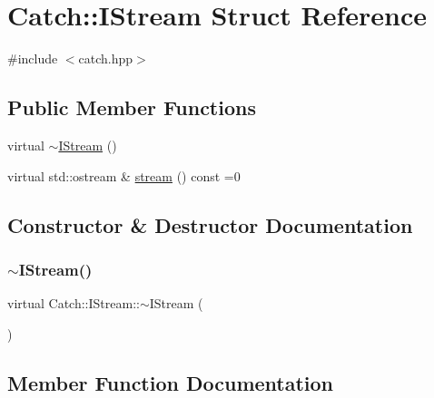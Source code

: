 \hypertarget{struct_catch_1_1_i_stream}{}\section{Catch\+:\+:I\+Stream Struct Reference}
\label{struct_catch_1_1_i_stream}


{\ttfamily \#include $<$catch.\+hpp$>$}

\subsection*{Public Member Functions}
\begin{DoxyCompactItemize}
\item 
virtual \mbox{\hyperlink{struct_catch_1_1_i_stream_a344a88d0e5fc1f727f5801c72b4a4e2a}{$\sim$\+I\+Stream}} ()
\item 
virtual std\+::ostream \& \mbox{\hyperlink{struct_catch_1_1_i_stream_a55a9ddbe250261ff38642f480ebdd902}{stream}} () const =0
\end{DoxyCompactItemize}


\subsection{Constructor \& Destructor Documentation}
\mbox{\label{struct_catch_1_1_i_stream_a344a88d0e5fc1f727f5801c72b4a4e2a}} 
\subsubsection{\texorpdfstring{$\sim$\+I\+Stream()}{~IStream()}}
{\footnotesize\ttfamily virtual Catch\+::\+I\+Stream\+::$\sim$\+I\+Stream (\begin{DoxyParamCaption}{ }\end{DoxyParamCaption})\hspace{0.3cm}{\ttfamily [virtual]}}



\subsection{Member Function Documentation}
\mbox{\label{struct_catch_1_1_i_stream_a55a9ddbe250261ff38642f480ebdd902}} 
